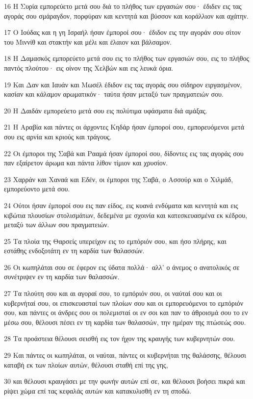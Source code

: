 \par 16 Η Συρία εμπορεύετο μετά σου διά το πλήθος των εργασιών σου· έδιδεν εις τας αγοράς σου σμάραγδον, πορφύραν και κεντητά και βύσσον και κοράλλιον και αχάτην.
\par 17 Ο Ιούδας και η γη Ισραήλ ήσαν έμποροί σου· έδιδον εις την αγοράν σου σίτον του Μιννίθ και στακτήν και μέλι και έλαιον και βάλσαμον.
\par 18 Η Δαμασκός εμπορεύετο μετά σου εις το πλήθος των εργασιών σου, εις το πλήθος παντός πλούτου· εις οίνον της Χελβών και εις λευκά όρια.
\par 19 Και Δαν και Ιαυάν και Μωσέλ έδιδον εις τας αγοράς σου σίδηρον ειργασμένον, κασίαν και κάλαμον αρωματικόν· ταύτα ήσαν μεταξύ των πραγματειών σου.
\par 20 Η Δαιδάν εμπορεύετο μετά σου εις πολύτιμα υφάσματα διά αμάξας.
\par 21 Η Αραβία και πάντες οι άρχοντες Κηδάρ ήσαν έμποροί σου, εμπορευόμενοι μετά σου εις αρνία και κριούς και τράγους.
\par 22 Οι έμποροι της Σαβά και Ρααμά ήσαν έμποροί σου, δίδοντες εις τας αγοράς σου παν εξαίρετον άρωμα και πάντα λίθον τίμιον και χρυσίον.
\par 23 Χαρράν και Χαναά και Εδέν, οι έμποροι της Σαβά, ο Ασσούρ και ο Χιλμάδ, εμπορεύοντο μετά σου.
\par 24 Ούτοι ήσαν έμποροί σου εις παν είδος, εις κυανά ενδύματα και κεντητά και εις κιβώτια πλουσίων στολισμάτων, δεδεμένα με σχοινία και κατεσκευασμένα εκ κέδρου, μεταξύ των άλλων σου πραγματειών.
\par 25 Τα πλοία της Θαρσείς υπερείχον εις το εμπόριόν σου, και ήσο πλήρης, και εστάθης ενδοξοτάτη εν τη καρδία των θαλασσών.
\par 26 Οι κωπηλάται σου σε έφερον εις ύδατα πολλά· αλλ' ο άνεμος ο ανατολικός σε συνέτριψεν εν τη καρδία των θαλασσών.
\par 27 Τα πλούτη σου και αι αγοραί σου, το εμπόριόν σου, οι ναύταί σου και οι κυβερνήταί σου, οι επισκευασταί των πλοίων σου και οι εμπορευόμενοι το εμπόριόν σου, και πάντες οι άνδρες σου οι πολεμισταί οι εν σοι και παν το άθροισμά σου το εν μέσω σου, θέλουσι πέσει εν τη καρδία των θαλασσών, την ημέραν της πτώσεώς σου.
\par 28 Τα προάστεια θέλουσι σεισθή εις τον ήχον της κραυγής των κυβερνητών σου.
\par 29 Και πάντες οι κωπηλάται, οι ναύται, πάντες οι κυβερνήται της θαλάσσης, θέλουσι καταβή εκ των πλοίων αυτών, θέλουσι σταθή επί της γης,
\par 30 και θέλουσι κραυγάσει με την φωνήν αυτών επί σε, και θέλουσι βοήσει πικρά και ρίψει χώμα επί τας κεφαλάς αυτών και κατακυλισθή εν τη σποδώ.
